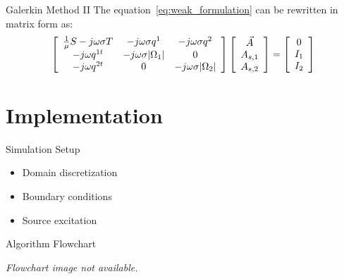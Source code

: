 \documentclass[aspectratio=54,xcolor=dvipsnames]{beamer}
\begin{document}
\begin{frame}{Galerkin Method II}
    The equation~\eqref{eq:weak_formulation} can be rewritten in matrix form as:
    \begin{equation}
        \left[
        \begin{array}{ccc}
            \frac{1}{\mu} S - j\omega \sigma T & -j\omega \sigma q^1 & -j\omega \sigma q^2 \\
            -j\omega q^{1t} & -j\omega \sigma \abs{\Omega_1} & 0 \\
            -j\omega q^{2t} & 0 & -j\omega \sigma \abs{\Omega_2}
        \end{array}
        \right]
        \left[
        \begin{array}{c}
            \vec{A} \\
            A_{s,1} \\
            A_{s,2}
        \end{array}
        \right]
        =
        \left[
        \begin{array}{c}
            0 \\
            I_1 \\
            I_2
        \end{array}
        \right]
    \end{equation}
\end{frame}

\section{Implementation}
\begin{frame}{Simulation Setup}
    \begin{itemize}
        \item Domain discretization
        \item Boundary conditions
        \item Source excitation
    \end{itemize}
\end{frame}

\begin{frame}{Algorithm Flowchart}
    \begin{center}
        \textit{Flowchart image not available.}
    \end{center}
\end{frame}
\end{document}
